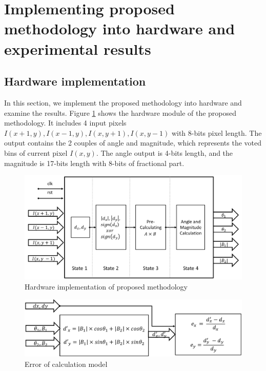 %
%


\section{Implementing proposed methodology into hardware and experimental results}
\label{sec:experimental_results}
\subsection{Hardware implementation}
\label{sub:hardware_pipeline_model}

In this section, we implement the proposed methodology into hardware and examine
the results.
Figure \ref{fig:hw_implementation_002} shows the hardware module of
the proposed methodology.
It includes 4 input pixels $I(x + 1, y), I(x - 1, y), I(x, y + 1), I(x, y - 1)$
with 8-bits pixel length.
The output contains the 2 couples of angle and magnitude, which represents the
voted bins of current pixel $I(x,y)$.
The angle output is 4-bits length, and the magnitude is 17-bits length with
8-bits of fractional part.

\begin{figure}[t]
	\centering
	\def\sscale{0.7\linewidth}
	\includegraphics[width=\sscale]{"imgs/hw_implementation"}
	\caption{Hardware implementation of proposed methodology}
	\label{fig:hw_implementation_002}
\end{figure}
\begin{figure}[t]
	\centering
	\def\sscale{.7\linewidth}
	\includegraphics[width=\sscale]{"imgs/verification_model"}
	\caption{Error of calculation model}
	\label{fig:verification_model}
\end{figure}


